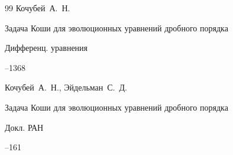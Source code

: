 \begin{thebibliography}{99}
\by Кочубей~А.~Н.

\paper Задача Коши для эволюционных уравнений дробного порядка

\jour Дифференц. уравнения




--1368

















\by Кочубей~А.~Н., Эйдельман~С.~Д.

\paper Задача Коши для эволюционных уравнений дробного порядка

\jour Докл. РАН




--161












\end{thebibliography}
